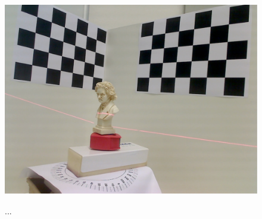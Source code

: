 \begin{figure}[bht]
\centering
\includegraphics[width=0.5\linewidth]{figures/introduction}
\label{figure:introduction}
\caption{...}
\end{figure}

